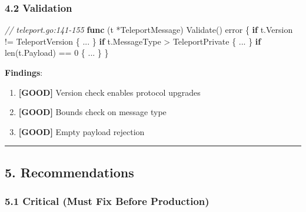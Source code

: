 \documentclass[
]{article}
\newenvironment{Shaded}{}{}
\newcommand{\BuiltInTok}[1]{\textcolor[rgb]{0.00,0.50,0.00}{#1}}
\newcommand{\CommentTok}[1]{\textcolor[rgb]{0.38,0.63,0.69}{\textit{#1}}}
\newcommand{\ControlFlowTok}[1]{\textcolor[rgb]{0.00,0.44,0.13}{\textbf{#1}}}
\newcommand{\DataTypeTok}[1]{\textcolor[rgb]{0.56,0.13,0.00}{#1}}
\newcommand{\DecValTok}[1]{\textcolor[rgb]{0.25,0.63,0.44}{#1}}
\newcommand{\KeywordTok}[1]{\textcolor[rgb]{0.00,0.44,0.13}{\textbf{#1}}}
\newcommand{\NormalTok}[1]{#1}
\newcommand{\OperatorTok}[1]{\textcolor[rgb]{0.40,0.40,0.40}{#1}}
\providecommand{\tightlist}{%
  \setlength{\itemsep}{0pt}\setlength{\parskip}{0pt}}
\begin{document}
\subsubsection{4.2 Validation}\label{42-validation}

\begin{Shaded}
\begin{Highlighting}[]
\CommentTok{// teleport.go:141{-}155}
\KeywordTok{func} \OperatorTok{(}\NormalTok{t }\OperatorTok{*}\NormalTok{TeleportMessage}\OperatorTok{)}\NormalTok{ Validate}\OperatorTok{()} \DataTypeTok{error} \OperatorTok{\{}
    \ControlFlowTok{if}\NormalTok{ t}\OperatorTok{.}\NormalTok{Version }\OperatorTok{!=}\NormalTok{ TeleportVersion }\OperatorTok{\{} \OperatorTok{...} \OperatorTok{\}}
    \ControlFlowTok{if}\NormalTok{ t}\OperatorTok{.}\NormalTok{MessageType }\OperatorTok{\textgreater{}}\NormalTok{ TeleportPrivate }\OperatorTok{\{} \OperatorTok{...} \OperatorTok{\}}
    \ControlFlowTok{if} \BuiltInTok{len}\OperatorTok{(}\NormalTok{t}\OperatorTok{.}\NormalTok{Payload}\OperatorTok{)} \OperatorTok{==} \DecValTok{0} \OperatorTok{\{} \OperatorTok{...} \OperatorTok{\}}
\OperatorTok{\}}
\end{Highlighting}
\end{Shaded}

\textbf{Findings}:

\begin{enumerate}
\def\labelenumi{\arabic{enumi}.}
\tightlist
\item
  \textbf{{[}GOOD{]}} Version check enables protocol upgrades
\item
  \textbf{{[}GOOD{]}} Bounds check on message type
\item
  \textbf{{[}GOOD{]}} Empty payload rejection
\end{enumerate}

\begin{center}\rule{0.5\linewidth}{0.5pt}\end{center}

\subsection{5. Recommendations}\label{5-recommendations}

\subsubsection{5.1 Critical (Must Fix Before
Production)}\label{51-critical-must-fix-before-production}
\end{document}
